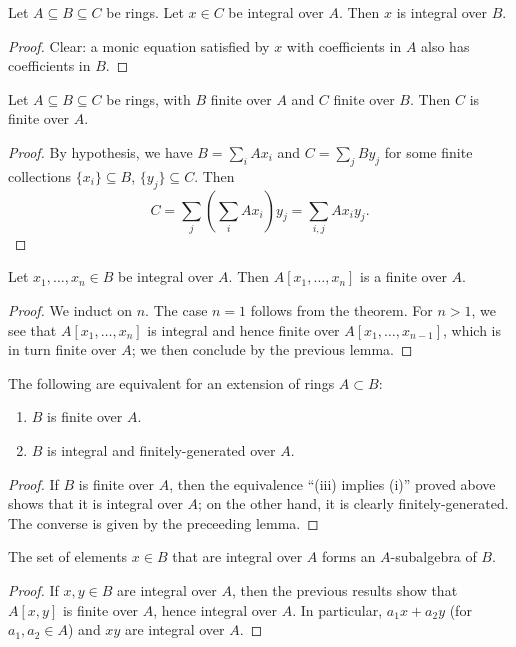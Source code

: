 \documentclass[reqno]{amsart}
\begin{document}
\begin{lemma}
  Let $A \subseteq B \subseteq C$ be rings.
  Let $x \in C$ be integral over $A$.
  Then $x$ is integral over $B$.
\end{lemma}
\begin{proof}
  Clear: a monic equation satisfied by $x$ with coefficients in $A$
  also has coefficients in $B$.
\end{proof}
\begin{lemma}
  Let $A \subseteq B \subseteq C$ be rings,
  with $B$ finite over $A$ and $C$ finite over $B$.
  Then $C$ is finite over $A$.
\end{lemma}
\begin{proof}
  By hypothesis,
  we have $B = \sum_i A x_i$ and $C = \sum_j B y_j$
  for some finite collections $\{x_i\} \subseteq B$,
  $\{y_j\} \subseteq C$.
  Then
  \[
  C = \sum_j (\sum_i A x_i) y_j
  = \sum_{i,j} A x_i y_j.
  \]
\end{proof}

\begin{lemma}
Let $x_1,\dotsc,x_n \in B$ be integral over $A$.
Then $A[x_1,\dotsc,x_n]$ is a finite over $A$.
\end{lemma}
\begin{proof}
  We induct on $n$.
  The case $n = 1$ follows from the theorem.
  For $n > 1$,
  we see that $A[x_1,\dotsc,x_n]$ is integral and hence finite
  over $A[x_1,\dotsc,x_{n-1}]$, which is in turn finite over
  $A$; we then conclude by the previous lemma.  
\end{proof}

\begin{corollary}
  The following are equivalent
  for an extension of rings $A \subset B$:
  \begin{enumerate}
  \item $B$ is finite over $A$.
  \item $B$ is integral and finitely-generated over $A$.
  \end{enumerate}
\end{corollary}
\begin{proof}
  If $B$ is finite over $A$,
  then the equivalence ``(iii) implies (i)''
  proved above
  shows that it is integral over $A$;
  on the other hand, it is clearly finitely-generated.
  The converse is given by the preceeding lemma.
\end{proof}

\begin{corollary}
  The set of elements $x \in B$ that are integral over $A$ forms
  an $A$-subalgebra of $B$.
\end{corollary}
\begin{proof}
  If $x,y \in B$ are integral over $A$,
  then the previous results show that $A[x,y]$
  is finite over $A$,
  hence integral over $A$.
  In particular, $a_1 x + a_2 y$ (for $a_1,a_2 \in A$)
  and $x y$ are integral over $A$.
\end{proof}
\end{document}
